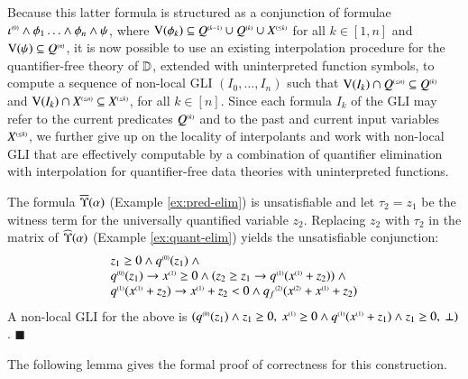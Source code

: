 \documentclass{llncs}
\begin{document}
Because this latter formula is structured as a conjunction of formulae
${\iota}^{\scriptscriptstyle{({0})}} \wedge \phi_1 \ldots \wedge \phi_n \wedge \psi$,
where $\mathrm{V}({\phi_k}) \subseteq {Q}^{\scriptscriptstyle{({k-1})}} \cup {Q}^{\scriptscriptstyle{({k})}} \cup
{X}^{\scriptscriptstyle{({\leq k})}}$ for all $k \in [1,n]$ and $\mathrm{V}({\psi}) \subseteq
{Q}^{\scriptscriptstyle{({n})}}$, it is now possible to use an existing interpolation
procedure for the quantifier-free theory of $\mathbb{D}$, extended with
uninterpreted function symbols, to compute a sequence of non-local GLI
$(I_0, \ldots, I_n)$ such that $\mathrm{V}({I_k}) \cap {Q}^{\scriptscriptstyle{({\leq n})}}
\subseteq {Q}^{\scriptscriptstyle{({k})}}$ and $\mathrm{V}({I_k}) \cap {X}^{\scriptscriptstyle{({\leq n})}}
\subseteq {X}^{\scriptscriptstyle{({\leq k})}}$, for all $k \in [n]$. Since each formula
$I_k$ of the GLI may refer to the current predicates ${Q}^{\scriptscriptstyle{({k})}}$
and to the past and current input variables ${X}^{\scriptscriptstyle{({\leq k})}}$, we
further give up on the locality of interpolants and work with
non-local GLI that are effectively computable by a combination of
quantifier elimination with interpolation for quantifier-free data
theories with uninterpreted functions.

\begin{example}\label{ex:gli}
The formula $\overline{\Upsilon}({\alpha})$ (Example \ref{ex:pred-elim}) is
unsatisfiable and let $\tau_2 = z_1$ be the witness term for the
universally quantified variable $z_2$. Replacing $z_2$ with $\tau_2$
in the matrix of $\widehat{\Upsilon}({\alpha})$ (Example \ref{ex:quant-elim})
yields the unsatisfiable conjunction: 
\[\begin{array}{l}
z_1 \geq 0 \wedge {q}^{\scriptscriptstyle{({0})}}(z_1) ~\wedge \\
{q}^{\scriptscriptstyle{({0})}}(z_1) \rightarrow {x}^{\scriptscriptstyle{({1})}} \geq 0 \wedge (z_2 \geq z_1 \rightarrow {q}^{\scriptscriptstyle{({1})}}({x}^{\scriptscriptstyle{({1})}}+z_2)) ~\wedge \\
{q}^{\scriptscriptstyle{({1})}}({x}^{\scriptscriptstyle{({1})}}+z_2) \rightarrow {x}^{\scriptscriptstyle{({1})}}+z_2 < 0 \wedge {q_f}^{\scriptscriptstyle{({2})}}({x}^{\scriptscriptstyle{({2})}}+{x}^{\scriptscriptstyle{({1})}}+z_2)
\end{array}\]
A non-local GLI for the above is $({q}^{\scriptscriptstyle{({0})}}(z_1) \wedge
z_1\geq 0,~ {x}^{\scriptscriptstyle{({1})}} \geq 0 \wedge {q}^{\scriptscriptstyle{({1})}}({x}^{\scriptscriptstyle{({1})}}+z_1)
\wedge z_1\geq0,~\bot)$. \hfill$\blacksquare$
\end{example}

The following lemma gives the formal proof of correctness for this
construction. 
\end{document}
